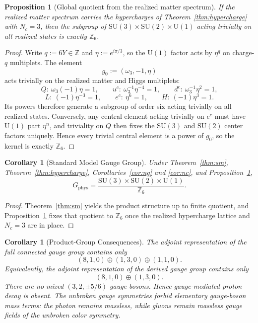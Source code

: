 \documentclass[11pt]{article}
\newtheorem{corollary}[theorem]{Corollary}
\newtheorem{proposition}[theorem]{Proposition}
\newcommand{\SU}{\mathrm{SU}}
\newcommand{\U}{\mathrm{U}}
\begin{document}
\begin{proposition}[Global quotient from the realized matter spectrum]\label{prop:z6}
If the realized matter spectrum carries the hypercharges of Theorem~\ref{thm:hypercharge} with $N_c=3$, then the subgroup of $\SU(3)\times\SU(2)\times\U(1)$ acting trivially on all realized states is exactly $\mathbb Z_6$.
\end{proposition}

\begin{proof}
Write $q:=6Y\in\mathbb Z$ and $\eta:=e^{i\pi/3}$, so the $\U(1)$ factor acts by $\eta^q$ on charge-$q$ multiplets. The element
\[
g_0:=(\omega_3,-1,\eta)
\]
acts trivially on the realized matter and Higgs multiplets:
\[
Q:\ \omega_3(-1)\eta=1,\qquad
u^c:\ \omega_3^{-1}\eta^{-4}=1,\qquad
d^c:\ \omega_3^{-1}\eta^2=1,
\]
\[
L:\ (-1)\eta^{-3}=1,\qquad
e^c:\ \eta^6=1,\qquad
H:\ (-1)\eta^3=1.
\]
Its powers therefore generate a subgroup of order six acting trivially on all realized states. Conversely, any central element acting trivially on $e^c$ must have $\U(1)$ part $\eta^n$, and triviality on $Q$ then fixes the $\SU(3)$ and $\SU(2)$ center factors uniquely. Hence every trivial central element is a power of $g_0$, so the kernel is exactly $\mathbb Z_6$.
\end{proof}

\begin{corollary}[Standard Model Gauge Group]
Under Theorem~\ref{thm:sm}, Theorem~\ref{thm:hypercharge}, Corollaries~\ref{cor:ng} and \ref{cor:nc}, and Proposition~\ref{prop:z6},
\[
G_{\mathrm{phys}}=
\frac{\SU(3)\times\SU(2)\times\U(1)}{\mathbb Z_6}.
\]
\end{corollary}

\begin{proof}
Theorem~\ref{thm:sm} yields the product structure up to finite quotient, and Proposition~\ref{prop:z6} fixes that quotient to $\mathbb Z_6$ once the realized hypercharge lattice and $N_c=3$ are in place.
\end{proof}

\begin{corollary}[Product-Group Consequences]
The adjoint representation of the full connected gauge group contains only
\[
(8,1,0)\oplus(1,3,0)\oplus(1,1,0).
\]
Equivalently, the adjoint representation of the derived gauge group contains only
\[
(8,1,0)\oplus(1,3,0).
\]
There are no mixed $(3,2,\pm 5/6)$ gauge bosons. Hence gauge-mediated proton decay is absent. The unbroken gauge symmetries forbid elementary gauge-boson mass terms: the photon remains massless, while gluons remain massless gauge fields of the unbroken color symmetry.
\end{corollary}
\end{document}

